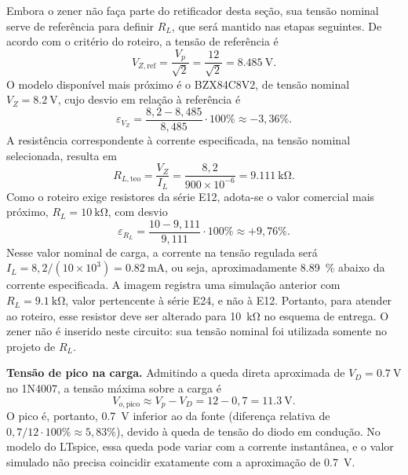 \documentclass[11pt,a4paper]{article}
\begin{document}
Embora o zener não faça parte do retificador desta seção, sua tensão nominal
serve de referência para definir $R_L$, que será mantido nas etapas seguintes.
De acordo com o critério do roteiro, a tensão de referência é
\begin{equation}
V_{Z,\mathrm{ref}}=\frac{V_p}{\sqrt{2}}=\frac{12}{\sqrt{2}}
=\SI{8,485}{\volt}.
\end{equation}
O modelo disponível mais próximo é o BZX84C8V2, de tensão nominal
$V_Z=\SI{8,2}{\volt}$, cujo desvio em relação à referência é
\begin{equation}
\varepsilon_{V_Z}=\frac{8,2-8,485}{8,485}\cdot100\%
\approx-3,36\%.
\end{equation}
A resistência correspondente à corrente especificada, na tensão nominal
selecionada, resulta em
\begin{equation}
R_{L,\mathrm{teo}}=\frac{V_Z}{I_L}
=\frac{8,2}{900\times10^{-6}}=\SI{9,111}{\kilo\ohm}.
\end{equation}
Como o roteiro exige resistores da série E12, adota-se o valor comercial
mais próximo, $R_L=\SI{10}{\kilo\ohm}$, com desvio
\begin{equation}
\varepsilon_{R_L}=\frac{10-9,111}{9,111}\cdot100\%
\approx+9,76\%.
\end{equation}
Nesse valor nominal de carga, a corrente na tensão regulada será
$I_L=8,2/(10\times10^3)=\SI{0,82}{\milli\ampere}$, ou seja, aproximadamente
\SI{8,89}{\percent} abaixo da corrente especificada. A imagem registra uma
simulação anterior com $R_L=\SI{9,1}{\kilo\ohm}$, valor pertencente à série
E24, e não à E12. Portanto, para atender ao roteiro, esse resistor deve ser
alterado para \SI{10}{\kilo\ohm} no esquema de entrega. O zener não é
inserido neste circuito: sua tensão nominal foi utilizada somente no
projeto de $R_L$.

\textbf{Tensão de pico na carga.}
Admitindo a queda direta aproximada de $V_D=\SI{0,7}{\volt}$ no 1N4007,
a tensão máxima sobre a carga é
\begin{equation}
V_{o,\mathrm{pico}}\approx V_p-V_D=12-0,7=\SI{11,3}{\volt}.
\end{equation}
O pico é, portanto, \SI{0,7}{\volt} inferior ao da fonte (diferença
relativa de $0,7/12\cdot100\%\approx5,83\%$), devido à queda de tensão
do diodo em condução. No modelo do LTspice, essa queda pode variar com a
corrente instantânea, e o valor simulado não precisa coincidir exatamente
com a aproximação de \SI{0,7}{\volt}.
\end{document}
